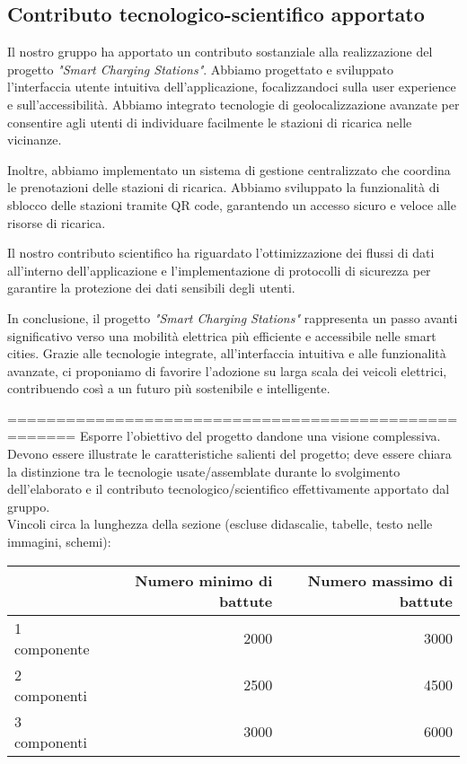 \subsection{Contributo tecnologico-scientifico apportato}
Il nostro gruppo ha apportato un contributo sostanziale alla realizzazione del progetto
\textit{"Smart Charging Stations"}. Abbiamo progettato e sviluppato l'interfaccia utente
intuitiva dell'applicazione, focalizzandoci sulla user experience e sull'accessibilità.
Abbiamo integrato tecnologie di geolocalizzazione avanzate per consentire agli utenti di
individuare facilmente le stazioni di ricarica nelle vicinanze.

Inoltre, abbiamo implementato un sistema di gestione centralizzato che coordina
le prenotazioni delle stazioni di ricarica. Abbiamo sviluppato la funzionalità di sblocco delle stazioni
tramite QR code, garantendo un accesso sicuro e veloce alle risorse di ricarica.

Il nostro contributo scientifico ha riguardato l'ottimizzazione dei flussi di dati all'interno
dell'applicazione e
l'implementazione di protocolli di sicurezza per garantire la protezione dei dati sensibili
degli utenti.

In conclusione, il progetto \textit{"Smart Charging Stations"} rappresenta un passo avanti
significativo verso una mobilità elettrica più efficiente e accessibile nelle smart cities.
Grazie alle tecnologie integrate, all'interfaccia intuitiva e alle funzionalità avanzate,
ci proponiamo di favorire l'adozione su larga scala dei veicoli elettrici, contribuendo
così a un futuro più sostenibile e intelligente.


=====================================================
Esporre l’obiettivo del progetto dandone una visione complessiva.\\

Devono essere illustrate le caratteristiche salienti del progetto; deve essere chiara la distinzione tra le tecnologie usate/assemblate durante lo svolgimento dell'elaborato e il contributo tecnologico/scientifico effettivamente apportato dal gruppo.\\


Vincoli circa la lunghezza della sezione (escluse didascalie, tabelle, testo nelle immagini, schemi):

\vspace{1cm}
\begin{tabular}{l|rr}
                 & Numero minimo di battute & Numero massimo di battute \\
    \hline
    1 componente & 2000                     & 3000                      \\
    2 componenti & 2500                     & 4500                      \\
    3 componenti & 3000                     & 6000                      \\
    \hline
\end{tabular}


\newpage
